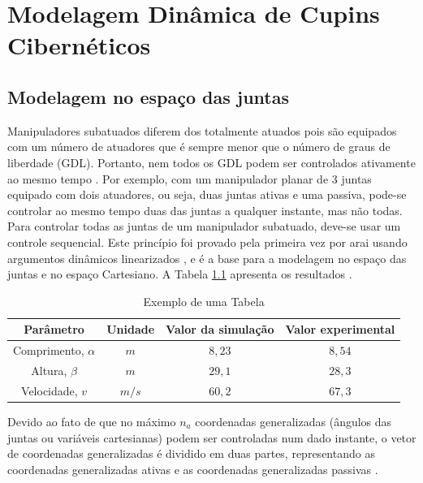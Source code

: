 \chapter{Modelagem Dinâmica de Cupins Cibern\'{e}ticos}

\section{Modelagem no espaço das juntas}
Manipuladores subatuados diferem dos totalmente atuados pois são equipados com um número de atuadores que é sempre menor que o número de graus de liberdade (GDL). Portanto, nem todos os GDL podem ser controlados ativamente ao mesmo tempo \cite{Sbornian2004}. Por exemplo, com um manipulador planar de 3 juntas equipado com dois atuadores, ou seja, duas juntas ativas e
uma passiva, pode-se controlar ao mesmo tempo duas das juntas a qualquer instante, mas não todas. Para controlar todas as juntas de um manipulador subatuado, deve-se usar um controle sequencial. Este princípio foi provado pela primeira vez por {arai} usando  argumentos dinâmicos linearizados \cite{Joea2003}, e é a base para a modelagem no espaço das juntas e no espaço Cartesiano. A Tabela \ref{minhatab} apresenta os resultados \cite{Assenmacher1993,Silberschatz1991,Caromel1998}.

\begin{table}
\caption{Exemplo de uma Tabela}
\label{minhatab}

\center
\begin{tabular}{cccc}
  \hline
	Parâmetro & Unidade & Valor da simulação & Valor experimental   \\
	\hline
  Comprimento, $\alpha$ & $m$ &  $8,23$  & $8,54$ \\
  Altura, $\beta$ & $m$     &  $29,1$ & $28,3$\\
	Velocidade, $v$ & $m/s$  &  $60,2$ & $67,3$\\
	\hline
\end{tabular}
\end{table}

Devido ao fato de que no máximo $n_{a}$ coordenadas generalizadas (ângulos das juntas ou variáveis cartesianas) podem ser controladas num dado instante, o vetor de coordenadas generalizadas é dividido em duas partes, representando as coordenadas generalizadas ativas e as coordenadas generalizadas passivas \cite{Callaghan1995}.

